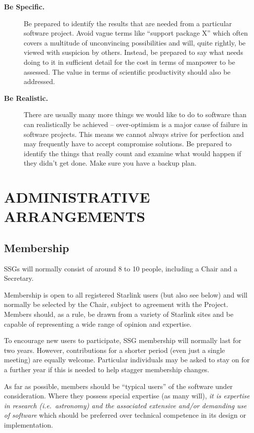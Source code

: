 \documentclass[twoside,11pt]{article}
\newcommand{\htmladdnormallink}[2]{#1}
\newcommand{\xlabel}[1]{}
\newcommand{\sitesref}[1]{\htmladdnormallink{#1}{http://www.starlink.ac.uk/sites.html}}
\newcommand{\st}[1]{{\em{#1}}}
\newcommand{\qt}[1]{``#1''}
\newcommand{\qt}[1]{{\tt{"}}#1{\tt{"}}}
\begin{document}
\begin{description}
\item[{\bf Be Specific.}] Be prepared to identify the results that are
needed from a particular software project. Avoid vague terms like
\qt{support package X} which often covers a multitude of unconvincing
possibilities and will, quite rightly, be viewed with suspicion by
others. Instead, be prepared to say what needs doing to it in
sufficient detail for the cost in terms of manpower to be assessed.
The value in terms of scientific productivity should also be
addressed.

\item[{\bf Be Realistic.}] There are usually many more things we would
like to do to software than can realistically be achieved --
over-optimism is a major cause of failure in software projects. This
means we cannot always strive for perfection and may frequently have
to accept compromise solutions.  Be prepared to identify the things
that really count and examine what would happen if they didn't get
done. Make sure you have a backup plan.

\end{description}

\section{\xlabel{admin_arrangements}\label{sect:admin}ADMINISTRATIVE ARRANGEMENTS}

\subsection{Membership}

SSGs will normally consist of around 8 to 10 people, including a Chair
and a Secretary.

Membership is open to all registered Starlink users (but also see
below) and will normally be selected by the Chair, subject to
agreement with the Project. Members should, as a rule, be drawn from a
variety of \sitesref{Starlink sites} and be capable of representing a
wide range of opinion and expertise.

To encourage new users to participate, SSG membership will normally
last for two years. However, contributions for a shorter period (even
just a single meeting) are equally welcome. Particular individuals may
be asked to stay on for a further year if this is needed to help stagger
membership changes.

As far as possible, members should be \qt{typical users} of the
software under consideration. Where they possess special expertise (as
many will), \st{it is expertise in research (\st{i.e.}\ astronomy) and
the associated extensive and/or demanding use of software} which
should be preferred over technical competence in its design or
implementation.
\end{document}
